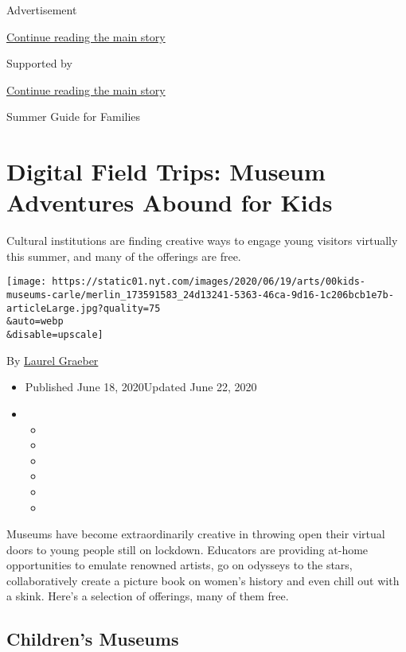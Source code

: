 Advertisement

\protect\hyperlink{after-top}{Continue reading the main story}

Supported by

\protect\hyperlink{after-sponsor}{Continue reading the main story}

Summer Guide for Families

\hypertarget{digital-field-trips-museum-adventures-abound-for-kids}{%
\section{Digital Field Trips: Museum Adventures Abound for
Kids}\label{digital-field-trips-museum-adventures-abound-for-kids}}

Cultural institutions are finding creative ways to engage young visitors
virtually this summer, and many of the offerings are free.

\texttt{[image: https://static01.nyt.com/images/2020/06/19/arts/00kids-museums-carle/merlin\_173591583\_24d13241-5363-46ca-9d16-1c206bcb1e7b-articleLarge.jpg?quality=75\\\&auto=webp\\\&disable=upscale]}

By \href{https://www.nytimes.com/by/laurel-graeber}{Laurel Graeber}

\begin{itemize}
\item
  Published June 18, 2020Updated June 22, 2020
\item
  \begin{itemize}
  \item
  \item
  \item
  \item
  \item
  \item
  \end{itemize}
\end{itemize}

Museums have become extraordinarily creative in throwing open their
virtual doors to young people still on lockdown. Educators are providing
at-home opportunities to emulate renowned artists, go on odysseys to the
stars, collaboratively create a picture book on women's history and even
chill out with a skink. Here's a selection of offerings, many of them
free.

\hypertarget{childrens-museums}{%
\subsection{Children's Museums}\label{childrens-museums}}

